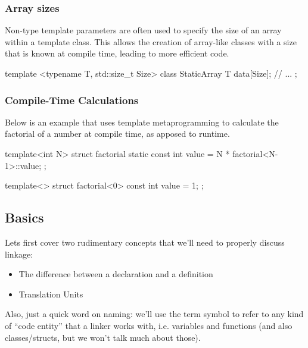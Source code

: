 \documentclass{report}
\begin{document}
\begin{concept}
    \bigbreak \noindent 
    \subsubsection{Array sizes}
    \bigbreak \noindent 
    Non-type template parameters are often used to specify the size of an array within a template class. This allows the creation of array-like classes with a size that is known at compile time, leading to more efficient code.
    \bigbreak \noindent 
    \begin{cppcode}
        template <typename T, std::size_t Size>
        class StaticArray {
            T data[Size];
            // ...
        };
    \end{cppcode}

    \pagebreak 
    \subsubsection{Compile-Time Calculations}
    Below is an example that uses template metaprogramming to calculate the factorial of a number at compile time, as apposed to runtime.
    \bigbreak \noindent 
    \begin{cppcode}
    template<int N>
    struct factorial {
        static const int value = N * factorial<N-1>::value;
    };

    template<>
    struct factorial<0> {
        const int value = 1;
    };
    \end{cppcode}

    \pagebreak 
    \bigbreak \noindent 

    \pagebreak 
    \bigbreak \noindent 
    \subsection{Basics}
    \bigbreak \noindent 
    Lets first cover two rudimentary concepts that we’ll need to properly discuss linkage:
    \begin{itemize}
        \item The difference between a declaration and a definition
        \item Translation Units
    \end{itemize}
    Also, just a quick word on naming: we’ll use the term symbol to refer to any kind of “code entity” that a linker works with, i.e. variables and functions (and also classes/structs, but we won’t talk much about those).
    \bigbreak \noindent 

\end{concept}
\end{document}
